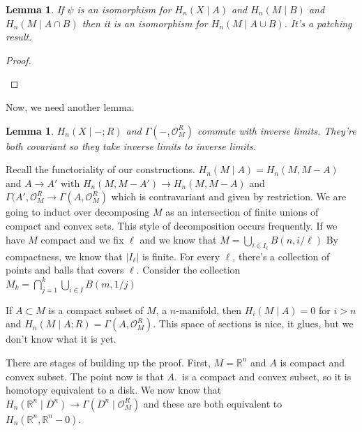 \documentclass[10pt]{article}
\newtheorem{lemma}[theorem]{Lemma}
\theoremstyle{definition}
\begin{document}
\begin{lemma}{1}
	If $\psi$ is an isomorphism for $H_n(X\mid A)$ and $H_n(M\mid B)$ and $H_n(M\mid A\cap B)$ then it is an isomorphism for $H_n(M\mid A\cup B)$. It's a patching result.
\end{lemma}
\begin{proof}
	\begin{center}
	\end{center}
\end{proof}
\noindent Now, we need another lemma.\\
\begin{lemma}{2}
	$H_n(X\mid-;R)$ and $\Gamma(-,\mathcal{O}_M^R) $ commute with inverse limits. They're both covariant so they take inverse limits to inverse limits. 
\end{lemma}
Recall the functoriality of our constructions. $H_n(M\mid A)=H_n(M,M-A)$ and $A\to A'$ with $H_n(M,M-A')\to H_n(M,M-A)$
and $\Gamma(A', \mathcal{O}^R_M\to \Gamma(A,\mathcal{O}_M^R)$ which is contravariant and given by restriction. We are going to induct over decomposing $M$ as an intersection of finite unions of compact and convex sets. This style of decomposition occurs frequently. If we have $M$ compact and we fix $\ell$ and we know that $M=\bigcup_{i\in I_\ell} B(n,i/\ell)$ By compactness, we know that $|I_\ell|$ is finite. For every $\ell$, there's a collection of points and balls that covers $\ell$. Consider the collection $M_k=\bigcap_{j=1}^k\bigcup_{i\in I}
B(m,1/j)$

If $A\subset M$ is a compact subset of $M$, a $n$-manifold, then $H_i(M\mid A)=0$ for $i>n$ and $H_n(M\mid A;R)=\Gamma(A,\mathcal{O}_M^R)$. This space of sections is nice, it glues, but we don't know what it is yet. 

There are stages of building up the proof. First, $M=\mathbb{R}^n$ and $A$ is compact and convex subset. The point now is that $A$.\ is a compact and convex subset, so it is homotopy equivalent to a disk. We now know that $H_n(\mathbb{R}^n\mid D^n)\to \Gamma(D^n\mid \mathcal{O}_M^R)$ and these are both equivalent to $H_n(\mathbb{R}^n, \mathbb{R}^n-0)$. 
\end{document}
